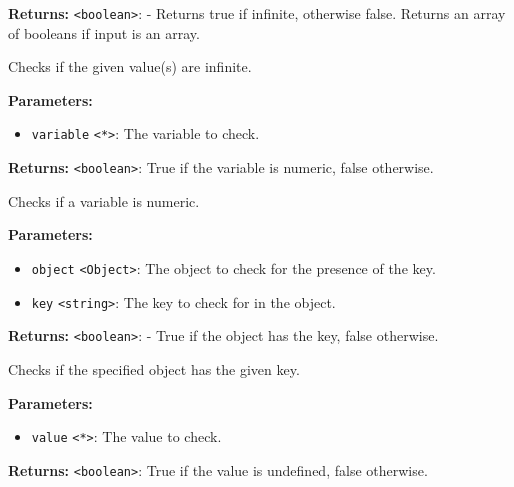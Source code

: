\documentclass[12pt,a4paper]{article}
\begin{document}
\noindent \textbf{Returns:} \texttt{<boolean>}: - Returns true if infinite, otherwise false. Returns an array of booleans if input is an array.

\noindent Checks if the given value(s) are infinite.

\vspace{5mm}
\noindent {}


\noindent \textbf{Parameters:}
\begin{itemize}
  \item \texttt{variable} \texttt{<*>}: The variable to check.
\end{itemize}

\noindent \textbf{Returns:} \texttt{<boolean>}: True if the variable is numeric, false otherwise.

\noindent Checks if a variable is numeric.

\vspace{5mm}
\noindent {}


\noindent \textbf{Parameters:}
\begin{itemize}
  \item \texttt{object} \texttt{<Object>}: The object to check for the presence of the key.
  \item \texttt{key} \texttt{<string>}: The key to check for in the object.
\end{itemize}

\noindent \textbf{Returns:} \texttt{<boolean>}: - True if the object has the key, false otherwise.

\noindent Checks if the specified object has the given key.

\vspace{5mm}
\noindent {}


\noindent \textbf{Parameters:}
\begin{itemize}
  \item \texttt{value} \texttt{<*>}: The value to check.
\end{itemize}

\noindent \textbf{Returns:} \texttt{<boolean>}: True if the value is undefined, false otherwise.
\end{document}
